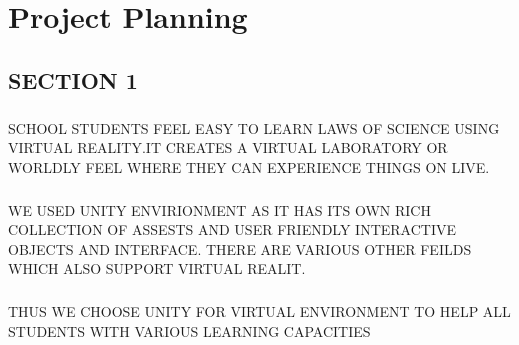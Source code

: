 \chapter{Project Planning}
\section{SECTION 1}
\paragraph{} SCHOOL STUDENTS FEEL EASY TO LEARN LAWS OF SCIENCE USING VIRTUAL REALITY.IT CREATES A VIRTUAL LABORATORY OR WORLDLY FEEL WHERE THEY CAN EXPERIENCE THINGS ON  LIVE.
  
\paragraph{}WE USED UNITY ENVIRIONMENT AS IT HAS ITS OWN RICH COLLECTION OF ASSESTS AND USER FRIENDLY INTERACTIVE OBJECTS AND INTERFACE. THERE ARE VARIOUS OTHER FEILDS WHICH ALSO SUPPORT VIRTUAL REALIT.
 \paragraph{}THUS WE CHOOSE UNITY FOR VIRTUAL ENVIRONMENT TO HELP ALL STUDENTS WITH VARIOUS LEARNING CAPACITIES